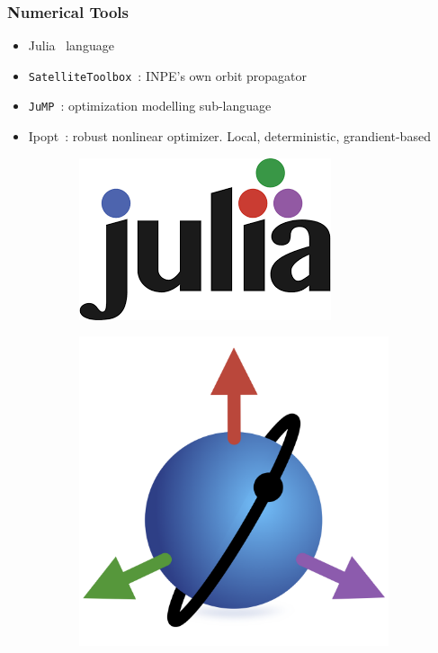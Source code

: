 \documentclass{beamer}
\begin{document}
\begin{frame}
    \frametitle{Numerical Tools}

    \begin{itemize}
        \item Julia~\cite{Julia-2017} language
        \item \texttt{SatelliteToolbox}~\cite{satellitetoolbox}: INPE's own orbit propagator
        \item \texttt{JuMP}~\cite{jump}: optimization modelling sub-language
        \item Ipopt~\cite{ipopt}: robust nonlinear optimizer. Local, deterministic, grandient-based
    \end{itemize}
    
    \begin{figure}[htbp]
        \centering
        \begin{subfigure}{0.24\textwidth}
            \includegraphics[width=\textwidth]{img/julia.png}
        \end{subfigure}
        \begin{subfigure}{0.24\textwidth}
            \includegraphics[width=\textwidth]{img/satellitetoolbox_logo.png}

\end{subfigure}
\end{figure}
\end{frame}
\end{document}
